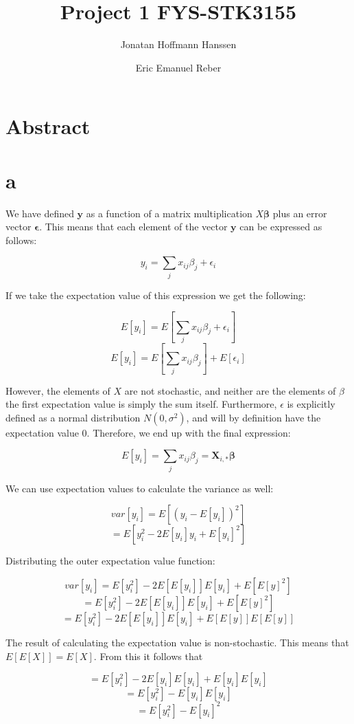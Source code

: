 \documentclass{article}
\author{Jonatan Hoffmann Hanssen \and Eric Emanuel Reber}
\title{Project 1 FYS-STK3155}
\begin{document}
	\maketitle

\section*{Abstract}

\section*{a}

We have defined $\bm{y}$ as a function of a matrix multiplication $X\bm{\beta}$
plus an error vector $\bm{\epsilon}$. This means that each element of the vector
$\bm{y}$ can be expressed as follows:

\[ y_i = \sum_j x_{ij}\beta_j + \epsilon_i \]

If we take the expectation value of this expression we get the following:

\[ E[y_i] = E\left[\sum_j x_{ij}\beta_j + \epsilon_i\right] \]
\[ E[y_i] = E\left[\sum_j x_{ij}\beta_j\right] + E[\epsilon_i] \]

However, the elements of $X$ are not stochastic, and neither are the elements of $\beta$
the first expectation value is simply the sum itself. Furthermore, $\epsilon$ is 
explicitly defined as a normal distribution $N(0,\sigma^2)$, and will by definition have
the expectation value $0$. Therefore, we end up with the final expression:

\[ E[y_i] = \sum_j x_{ij}\beta_j = \bm{X}_{i,*}\bm{\beta}\]

We can use expectation values to calculate the variance as well:

\[ var[y_i] = E\left[(y_i - E[y_i])^2\right] \]
\[ = E\left[y_i^2 - 2E[y_i]y_i + E[y_i]^2\right] \]

Distributing the outer expectation value function:

\[ var[y_i] = E[y_i^2] - 2E\left[E[y_i]\right]E[y_i] + E\left[E[y]^2\right] \]
\[ = E[y_i^2] - 2E\left[E[y_i]\right]E[y_i] + E\left[E[y]^2\right] \]
\[ = E[y_i^2] - 2E\left[E[y_i]\right]E[y_i] + E\left[E[y]\right]E\left[E[y]\right] \]

The result of calculating the expectation value is non-stochastic. This means that
$E[E[X]] = E[X]$. From this it follows that

\[ = E[y_i^2] - 2E[y_i]E[y_i] + E[y_i]E[y_i] \]
\[ = E[y_i^2] - E[y_i]E[y_i] \]
\[ = E[y_i^2] - E[y_i]^2 \]
\end{document}
